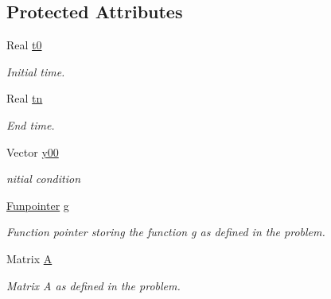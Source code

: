 \subsection*{Protected Attributes}
\begin{DoxyCompactItemize}
\item 
\mbox{\label{class_o_d_e___system_a1947b357608babc98c5e79d645e24c3c}} 
Real \mbox{\hyperlink{class_o_d_e___system_a1947b357608babc98c5e79d645e24c3c}{t0}}
\begin{DoxyCompactList}\small\item\em Initial time. \end{DoxyCompactList}\item 
\mbox{\label{class_o_d_e___system_a5c5a0dd9f04dfb8d8a84d49b741773af}} 
Real \mbox{\hyperlink{class_o_d_e___system_a5c5a0dd9f04dfb8d8a84d49b741773af}{tn}}
\begin{DoxyCompactList}\small\item\em End time. \end{DoxyCompactList}\item 
\mbox{\label{class_o_d_e___system_a1379137a4480e5861fd1911bc061f908}} 
Vector \mbox{\hyperlink{class_o_d_e___system_a1379137a4480e5861fd1911bc061f908}{y00}}
\begin{DoxyCompactList}\small\item\em nitial condition \end{DoxyCompactList}\item 
\mbox{\label{class_o_d_e___system_a2dee2a4b3468547c3ddab15edfc8ddfd}} 
\mbox{\hyperlink{class_o_d_e___system_a9ff6775dafbba78d49f164174aa7074e}{Funpointer}} \mbox{\hyperlink{class_o_d_e___system_a2dee2a4b3468547c3ddab15edfc8ddfd}{g}}
\begin{DoxyCompactList}\small\item\em Function pointer storing the function g as defined in the problem. \end{DoxyCompactList}\item 
\mbox{\label{class_o_d_e___system_a632009677e80b62a1996e842398bf8b6}} 
Matrix \mbox{\hyperlink{class_o_d_e___system_a632009677e80b62a1996e842398bf8b6}{A}}
\begin{DoxyCompactList}\small\item\em Matrix A as defined in the problem. \end{DoxyCompactList}\item 

\end{DoxyCompactItemize}
